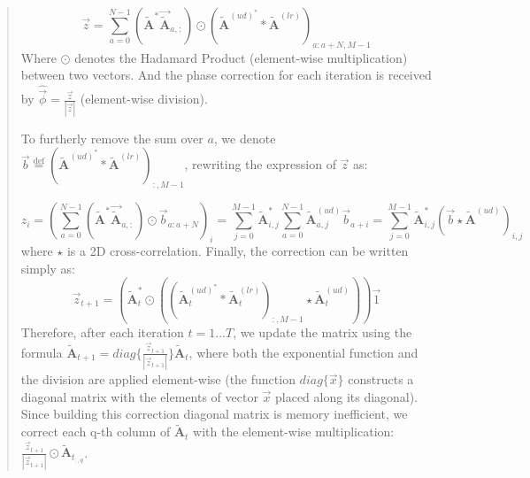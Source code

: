 \documentclass[12pt]{article}
\newenvironment{ourresponse}
    {\begin{tcolorbox}[width=\linewidth,breakable,enhanced,colback=gray!5,colframe=responsecolor!50,title=Response,left=5pt,right=5pt]}
    {\end{tcolorbox}}
\begin{document}
\begin{enumerate}[label=\arabic*.]
\begin{ourresponse}
\begin{quote}
            \begin{equation}
            \vec{z}=\sum^{N-1}_{a=0}(\tilde{\textbf{A}}^*\vec{\tilde{\textbf{A}}}_{a,:})\odot(\tilde{\textbf{A}}^{(ud)^*}*\tilde{\textbf{A}}^{(lr)})_{a:a+N,M-1}
            \label{eq:11} \tag{S11}
            \end{equation}
            Where $\odot$ denotes the Hadamard Product (element-wise multiplication) between two vectors. And the phase correction for each iteration is received by $\hat{\vec{\phi}} = \frac{\vec{z}}{|\vec{z}|}$ (element-wise division).
            
            To furtherly remove the sum over $a$, we denote $\vec{b}\stackrel{\text{def}} = (\tilde{\textbf{A}}^{(ud)^*}*\tilde{\textbf{A}}^{(lr)})_{:,M-1}$, rewriting the expression of $\vec{z}$ as:
            
            \begin{equation}
            z_i=(\sum^{N-1}_{a=0}(\tilde{\textbf{A}}^*\vec{\tilde{\textbf{A}}}_{a,:})\odot\vec{b}_{a:a+N})_i =\sum^{M-1}_{j=0} \tilde{\textbf{A}}^*_{i,j}\sum^{N-1}_{a=0}\tilde{\textbf{A}}^{(ud)}_{a,j}\vec{b}_{a+i}=\sum^{M-1}_{j=0} \tilde{\textbf{A}}^*_{i,j}(\vec{b} \star \tilde{\textbf{A}}^{(ud)})_{i,j}
            \label{eq:12}  \tag{S12}
            \end{equation}
            where $\star$ is a 2D cross-correlation.
            Finally, the correction can be written simply as:
            \begin{equation}
            \vec{z}_{t+1}=(\tilde{\textbf{A}}_t^* \odot ((\tilde{\textbf{A}}_t^{(ud)^*}*\tilde{\textbf{A}}_t^{(lr)})_{:,M-1} \star \tilde{\textbf{A}}_t^{(ud)}))\vec{1}
            \label{eq:13}  \tag{S13}
            \end{equation}
            Therefore, after each iteration $t = 1...T$, we update the matrix using the formula
            $\tilde{\textbf{A}}_{t+1}=diag\{\frac{\vec{z}_{t+1}}{|\vec{z}_{t+1}|}\}\tilde{\textbf{A}}_t$, where both the exponential function and the division are applied element-wise  (the function $diag\{\vec{x}\}$ constructs a diagonal matrix with the elements of vector $\vec{x}$ placed along its diagonal).
            Since building this correction diagonal matrix is memory inefficient, we correct each q-th column of $\tilde{\textbf{A}}_t$ with the element-wise multiplication: $ \frac{\vec{z}_{t+1}}{|\vec{z}_{t+1}|} \odot \tilde{\textbf{A}}_{t_{:,q}}$.
            

\end{quote}
\end{ourresponse}
\end{enumerate}
\end{document}

